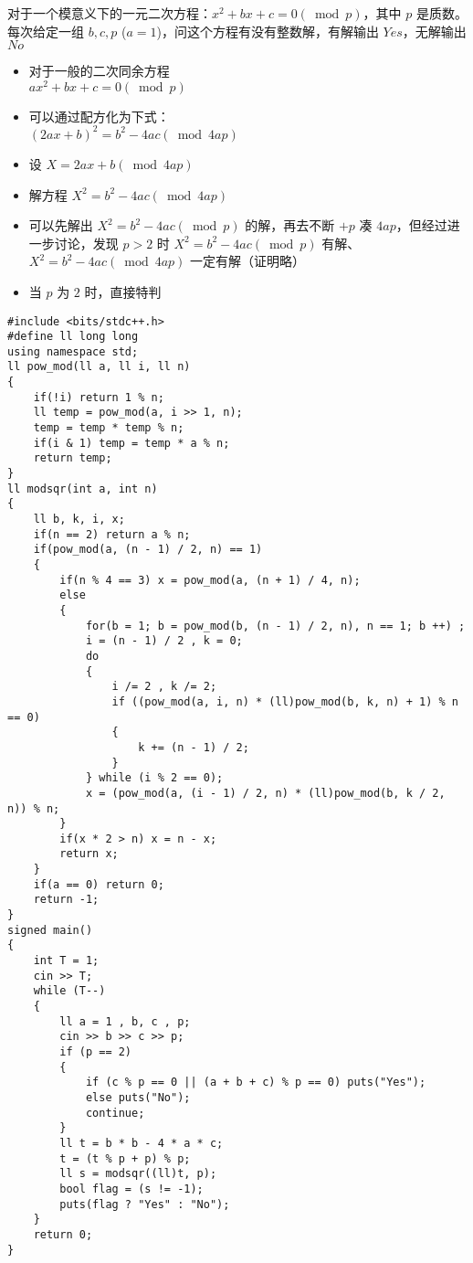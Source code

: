 \documentclass[E:/GsjzTle/main/main.tex]{subfiles}
\begin{document}
对于一个模意义下的一元二次方程：\(x^2 + bx + c = 0 (\bmod p)\)，其中
\(p\) 是质数。\\
每次给定一组 \(b,c,p\) (\(a = 1\))，问这个方程有没有整数解，有解输出
\(Yes\)，无解输出 \(No\)

\begin{itemize}
\item
  对于一般的二次同余方程\\
  \(a x^{2}+b x+c=0(\bmod p)\)
\item
  可以通过配方化为下式：\\
  \((2 a x+b)^{2}=b^{2}-4 a c(\bmod 4 a p)\)
\item
  设 \(X=2 a x+b(\bmod 4 a p)\)
\item
  解方程 \(X^{2}=b^{2}-4 a c(\bmod 4 a p)\)
\item
  可以先解出 \(X^{2}=b^{2}-4 a c(\bmod p)\) 的解，再去不断 \(+p\) 凑
  \(4ap\)，但经过进一步讨论，发现 \(p>2\) 时
  \(X^{2}=b^{2}-4 a c(\bmod p)\)
  有解、\(X^{2}=b^{2}-4 a c(\bmod 4 a p)\) 一定有解（证明略）
\item
  当 \(p\) 为 \(2\) 时，直接特判
\end{itemize}

\begin{lstlisting}
#include <bits/stdc++.h>
#define ll long long
using namespace std;
ll pow_mod(ll a, ll i, ll n)
{
	if(!i) return 1 % n;
	ll temp = pow_mod(a, i >> 1, n);
	temp = temp * temp % n;
	if(i & 1) temp = temp * a % n;
	return temp;
}
ll modsqr(int a, int n)
{
	ll b, k, i, x;
	if(n == 2) return a % n;
	if(pow_mod(a, (n - 1) / 2, n) == 1)
	{
		if(n % 4 == 3) x = pow_mod(a, (n + 1) / 4, n);
		else
		{
			for(b = 1; b = pow_mod(b, (n - 1) / 2, n), n == 1; b ++) ;
			i = (n - 1) / 2 , k = 0;
			do
			{
				i /= 2 , k /= 2;
				if ((pow_mod(a, i, n) * (ll)pow_mod(b, k, n) + 1) % n == 0)
				{
					k += (n - 1) / 2;
				}
			} while (i % 2 == 0);
			x = (pow_mod(a, (i - 1) / 2, n) * (ll)pow_mod(b, k / 2, n)) % n;
		}
		if(x * 2 > n) x = n - x;
		return x;
	}
	if(a == 0) return 0;
	return -1;
}
signed main()
{
	int T = 1;
	cin >> T;
	while (T--)
	{
		ll a = 1 , b, c , p;
		cin >> b >> c >> p;
		if (p == 2)
		{
			if (c % p == 0 || (a + b + c) % p == 0) puts("Yes");
			else puts("No");
			continue;
		}
		ll t = b * b - 4 * a * c;
		t = (t % p + p) % p;
		ll s = modsqr((ll)t, p);
		bool flag = (s != -1);
		puts(flag ? "Yes" : "No");
	}
	return 0;
}
\end{lstlisting}
\end{document}
